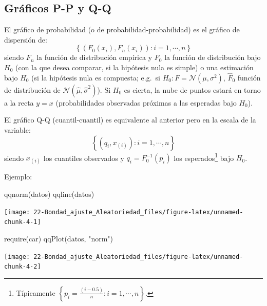 \documentclass[
]{book}
\newenvironment{Shaded}{\begin{snugshade}}{\end{snugshade}}
\newcommand{\FunctionTok}[1]{\textcolor[rgb]{0.00,0.00,0.00}{#1}}
\newcommand{\NormalTok}[1]{#1}
\newcommand{\StringTok}[1]{\textcolor[rgb]{0.31,0.60,0.02}{#1}}
\theoremstyle{break}
\theoremstyle{definition}
\theoremstyle{definition}
\theoremstyle{definition}
\theoremstyle{definition}
\theoremstyle{remark}
\begin{document}
\hypertarget{gruxe1ficos-p-p-y-q-q}{%
\subsection{Gráficos P-P y Q-Q}\label{gruxe1ficos-p-p-y-q-q}}

El gráfico de probabilidad (o de probabilidad-probabilidad) es el gráfico de dispersión de:
\[\left \{  \left( F_0(x_{i}), F_n(x_{i}) \right)  :i=1,\cdots,n\right \}\]
siendo \(F_n\) la función de distribución empírica y \(F_0\) la función de distribución bajo \(H_0\) (con la que desea comparar, si la hipótesis nula es simple) o una estimación bajo \(H_0\) (si la hipótesis nula es compuesta; e.g.~si \(H_0:F= \mathcal{N}(\mu,\sigma^2)\),
\(\hat{F}_0\) función de distribución de \(\mathcal{N}(\hat{\mu},\hat{\sigma}^2)\)).
Si \(H_0\) es cierta, la nube de puntos estará en torno a la recta \(y=x\) (probabilidades observadas próximas a las esperadas bajo \(H_0\)).

El gráfico Q-Q (cuantil-cuantil) es equivalente al anterior pero en la escala de la variable:
\[\left\{ \left( q_{i}, x_{(i)}\right) : i=1, \cdots, n \right\}\]
siendo \(x_{(i)}\) los cuantiles observados y \(q_{i}=F_0^{-1}(p_{i})\) los esperados\footnote{Típicamente \(\left \{ p_{i}=\frac{\left(i-0.5 \right)}n : i=1, \cdots, n \right\}\).} bajo \(H_0\).

Ejemplo:

\begin{Shaded}
\begin{Highlighting}[]
\FunctionTok{qqnorm}\NormalTok{(datos)}
\FunctionTok{qqline}\NormalTok{(datos)}
\end{Highlighting}
\end{Shaded}

\begin{center}\texttt{[image: 22-Bondad\_ajuste\_Aleatoriedad\_files/figure-latex/unnamed-chunk-4-1]} \end{center}

\begin{Shaded}
\begin{Highlighting}[]
\FunctionTok{require}\NormalTok{(car)}
\FunctionTok{qqPlot}\NormalTok{(datos, }\StringTok{"norm"}\NormalTok{)}
\end{Highlighting}
\end{Shaded}

\begin{center}\texttt{[image: 22-Bondad\_ajuste\_Aleatoriedad\_files/figure-latex/unnamed-chunk-4-2]} \end{center}
\end{document}

